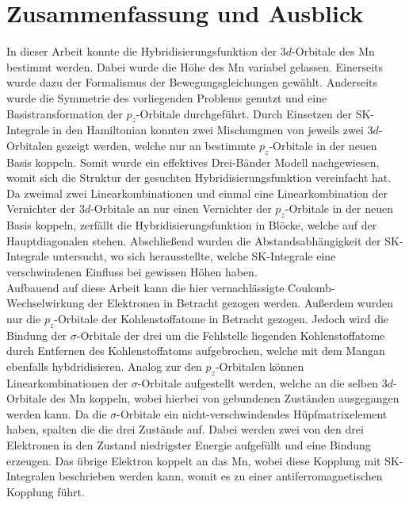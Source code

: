 \chapter{Zusammenfassung und Ausblick}
\label{chap:Zusammenfassung_und_Ausblick}
In dieser Arbeit konnte die Hybridisierungsfunktion der $3d$-Orbitale des Mn bestimmt werden.
Dabei wurde die Höhe des Mn variabel gelassen.
Einerseits wurde dazu der Formalismus der Bewegungsgleichungen gewählt.
Anderseits wurde die Symmetrie des vorliegenden Problems genutzt und eine Basistransformation der $p_z$-Orbitale durchgeführt. 
Durch Einsetzen der SK-Integrale in den Hamiltonian konnten zwei Mischungmen von jeweils zwei $3d$-Orbitalen gezeigt werden, welche nur 
an bestimmte $p_z$-Orbitale in der neuen Basis koppeln.
Somit wurde ein effektives Drei-Bänder Modell nachgewiesen, womit sich die Struktur der gesuchten Hybridisierungsfunktion vereinfacht hat. 
Da zweimal zwei Linearkombinationen und einmal eine Linearkombination der Vernichter der $3d$-Orbitale an nur einen Vernichter der $p_z$-Orbitale in der neuen Basis 
koppeln, zerfällt die Hybridisierungsfunktion in Blöcke, welche auf der Hauptdiagonalen stehen. 
Abschließend wurden die Abstandsabhängigkeit der SK-Integrale untersucht, wo sich herausstellte, welche SK-Integrale 
eine verschwindenen Einfluss bei gewissen Höhen haben.\\
Aufbauend auf diese Arbeit kann die hier vernachlässigte Coulomb-Wechselwirkung der Elektronen in Betracht gezogen werden.
Außerdem wurden nur die $p_z$-Orbitale der Kohlenstoffatome in Betracht gezogen.
Jedoch wird die Bindung der $\sigma$-Orbitale der drei um die Fehlstelle liegenden Kohlenstoffatome durch Entfernen des Kohlenstoffatoms
aufgebrochen, welche mit dem Mangan ebenfalls hybdridisieren.
Analog zur den $p_z$-Orbitalen können Linearkombinationen der $\sigma$-Orbitale aufgestellt werden, welche an die selben 
$3d$-Orbitale des Mn koppeln, wobei hierbei von gebundenen Zuständen ausgegangen werden kann.
Da die $\sigma$-Orbitale ein nicht-verschwindendes Hüpfmatrixelement haben, spalten die die drei Zustände auf.
Dabei werden zwei von den drei Elektronen in den Zustand niedrigster Energie aufgefüllt und eine Bindung erzeugen. 
Das übrige Elektron koppelt an das Mn, wobei diese Kopplung mit SK-Integralen beschrieben werden kann, womit 
es zu einer antiferromagnetischen Kopplung führt.
